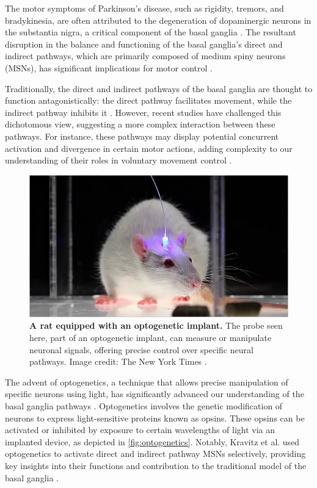 \documentclass[10pt]{article}
\begin{document}
\begin{sloppypar}
  The motor symptoms of Parkinson’s disease, such as rigidity, tremors, and bradykinesia, are often attributed to the degeneration of dopaminergic neurons in the substantia nigra, a critical component of the basal ganglia \citep{abedini_cooccurrence_2015}. The resultant disruption in the balance and functioning of the basal ganglia’s direct and indirect pathways, which are primarily composed of medium spiny neurons (MSNs), has significant implications for motor control \cite{abedini_cooccurrence_2015,ojagbemi_neuropsychiatric_2013}.

  Traditionally, the direct and indirect pathways of the basal ganglia are thought to function antagonistically: the direct pathway facilitates movement, while the indirect pathway inhibits it \citep{isett_indirect_2022}. However, recent studies have challenged this dichotomous view, suggesting a more complex interaction between these pathways. For instance, these pathways may display potential concurrent activation and divergence in certain motor actions, adding complexity to our understanding of their roles in voluntary movement control \citep{perez_striatal_2017}.

  \begin{figure}[ht]
    \centering
    \includegraphics[width=\textwidth]{figures/optogenetics.png}
    \caption[A rat equipped with an optogenetic implant]{\textbf{A rat equipped with an optogenetic implant.} The probe seen here, part of an optogenetic implant, can measure or manipulate neuronal signals, offering precise control over specific neural pathways. Image credit: The New York Times \citep{belluck_risky_2016}.}
    \label{fig:optogenetics}
  \end{figure}

  The advent of optogenetics, a technique that allows precise manipulation of specific neurons using light, has significantly advanced our understanding of the basal ganglia pathways \citep{deisseroth_next-generation_2006}. Optogenetics involves the genetic modification of neurons to express light-sensitive proteins known as opsins. These opsins can be activated or inhibited by exposure to certain wavelengths of light via an implanted device, as depicted in \autoref{fig:optogenetics}. Notably, Kravitz et al. used optogenetics to activate direct and indirect pathway MSNs selectively, providing key insights into their functions and contribution to the traditional model of the basal ganglia \citep{kravitz_regulation_2010}.


\end{sloppypar}
\end{document}
